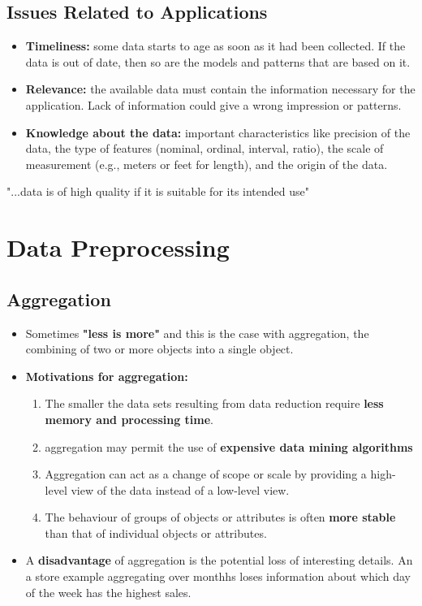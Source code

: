 	\subsection*{Issues Related to Applications}
		\begin{itemize}
			\item {\bf Timeliness:} some data starts to age as soon as it had been 
			collected. If the data is out of date, then so are the models and patterns
			that are based on it. 
			\item {\bf Relevance:} the available data must contain the information necessary
			for the application. Lack of information could give a wrong impression or patterns.
			\item {\bf Knowledge about the data:} important characteristics like precision of the
			data, the type of features (nominal, ordinal, interval, ratio), the scale of 
			measurement (e.g., meters or feet for length), and the origin of the data.
		\end{itemize}

		\vspace{0.5cm}

		{\LARGE "...data is of high quality if it is suitable for its intended use"}



\section{Data Preprocessing}
	
	\subsection{Aggregation}
		\begin{itemize}
			\item Sometimes {\bf "less is more"} and this is the case with aggregation, 
			the combining of two or more objects into a single object. 
			\item {\bf Motivations for aggregation:}
				\begin{enumerate}
					\item The smaller the data sets resulting from data reduction
					require {\bf less memory and processing time}.
					\item aggregation may permit the use of {\bf expensive data mining 
					algorithms}
					\item Aggregation can act as a change of scope or scale by providing a
					high-level view of the data instead of a low-level view. 
					\item The behaviour of groups of objects or attributes is often {\bf more
					stable} than that of individual objects or attributes. 
				\end{enumerate}
			\item A {\bf disadvantage} of aggregation is the potential loss of interesting details. 
			An a store example aggregating over monthhs loses information about which day of the
			week has the highest sales. 
		\end{itemize}

